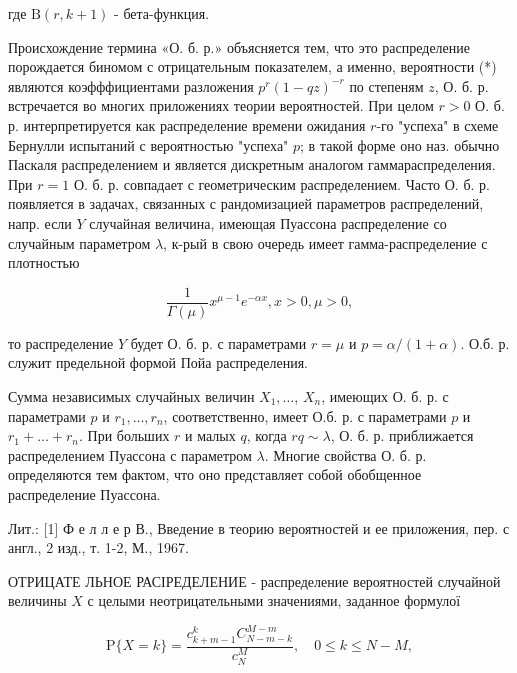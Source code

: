 \documentclass[10pt]{article}
\begin{document}
где $\mathrm{B}(r, k+1)$ - бета-функция.



Происхождение термина «О. б. р.» объясняется тем, что это распределение порождается биномом с отрицательным показателем, а именно, вероятности (*) являются коэфффициентами разложения $p^{r}(1-q z)^{-r}$ по степеням $z$, О. б. р. встречается во многих приложениях теории вероятностей. При целом $r>0$ О. б. р. интерпретируется как распределение времени ожидания $r$-го "успеха" в схеме Бернулли испытаний с вероятностью "успеха" $p$; в такой форме оно наз. обычно Паскаля распределением и является дискретным аналогом гаммараспределения. При $r=1$ О. б. р. совпадает с геометрическим распределением. Часто О. б. р. появляется в задачах, связанных с рандомизацией параметров распределений, напр. если $Y$ случайная величина, имеющая Пуассона распределение со случайным параметром $\lambda$, к-рый в свою очередь имеет гамма-распределение с плотностью



\[

\frac{1}{\Gamma(\mu)} x^{\mu-1} e^{-\alpha x}, x>0, \mu>0,

\]



то распределение $Y$ будет О. б. р. с параметрами $r=\mu$ и $p=\alpha /(1+\alpha)$. О.б. р. служит предельной формой Пойа распределения.



Сумма независимых случайных величин $X_{1}, \ldots$, $X_{n}$, имеющих О. б. р. с параметрами $p$ и $r_{1}, \ldots, r_{n}$, соответственно, имеет О.б. р. с параметрами $p$ и $r_{1}+\ldots+r_{n}$. При больших $r$ и малых $q$, когда $r q \sim \lambda$, О. б. р. приближается распределением Пуассона с параметром $\lambda$. Многие свойства О. б. р. определяются тем фактом, что оно представляет собой обобщенное распределение Пуассона.



Лит.: [1] Ф е л л е р В., Введение в теорию вероятностей и ее приложения, пер. с англ., 2 изд., т. 1-2, М., 1967.



ОТРИЦАТЕ ЛЬНОЕ РАСІРЕДЕЛЕНИЕ - распределение вероятностей случайной величины $X$ с целыми неотрицательными значениями, заданное формулої



\[

\mathrm{P}\{X=k\}=\frac{c_{k+m-1}^{k} C_{N-m-k}^{M-m}}{c_{N}^{M}}, \quad 0 \leqslant k \leqslant N-M,

\]
\end{document}
